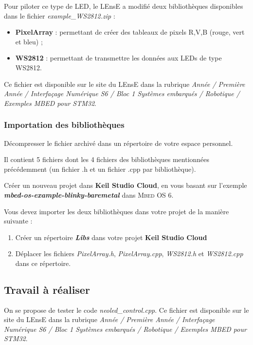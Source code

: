 \documentclass[a4paper,11pt,titlepage]{article} %
\begin{document}
Pour piloter ce type de LED, le LEnsE a modifié deux bibliothèques disponibles dans le fichier \textsl{example\_WS2812.zip} :

\begin{itemize}
	\item \textbf{PixelArray} : permettant de créer des tableaux de pixels R,V,B (rouge, vert et bleu) ;
	\item \textbf{WS2812} : permettant de transmettre les données aux LEDs de type WS2812.
\end{itemize}

Ce fichier est disponible sur le site du LEnsE dans la rubrique \textit{Année / Première Année / Interfaçage Numérique S6 / Bloc 1 Systèmes embarqués / Robotique / Exemples MBED pour STM32}.

\subsubsection{Importation des bibliothèques}

\Manip Décompresser le fichier archivé dans un répertoire de votre espace personnel.

Il contient 5 fichiers dont les 4 fichiers des bibliothèques mentionnées précédemment (un fichier .h et un fichier .cpp par bibliothèque).

\Manip Créer un nouveau projet dans \textbf{Keil Studio Cloud}, en vous basant sur l'exemple \textbf{\textsl{mbed-os-example-blinky-baremetal}} dans \textsc{Mbed OS 6}. 

\bigskip

Vous devez importer les deux bibliothèques dans votre projet de la manière suivante :

\begin{enumerate}
	\item Créer un répertoire \textsl{\textbf{Libs}} dans votre projet \textbf{Keil Studio Cloud}
	\item Déplacer les fichiers \textsl{PixelArray.h}, \textsl{PixelArray.cpp}, \textsl{WS2812.h} et \textsl{WS2812.cpp} dans ce répertoire.
\end{enumerate}

\newpage
\subsection{Travail à réaliser}

On se propose de tester le code \textsl{neoled\_control.cpp}. Ce fichier est disponible sur le site du LEnsE dans la rubrique \textit{Année / Première Année / Interfaçage Numérique S6 / Bloc 1 Systèmes embarqués / Robotique / Exemples MBED pour STM32}.
\end{document}
